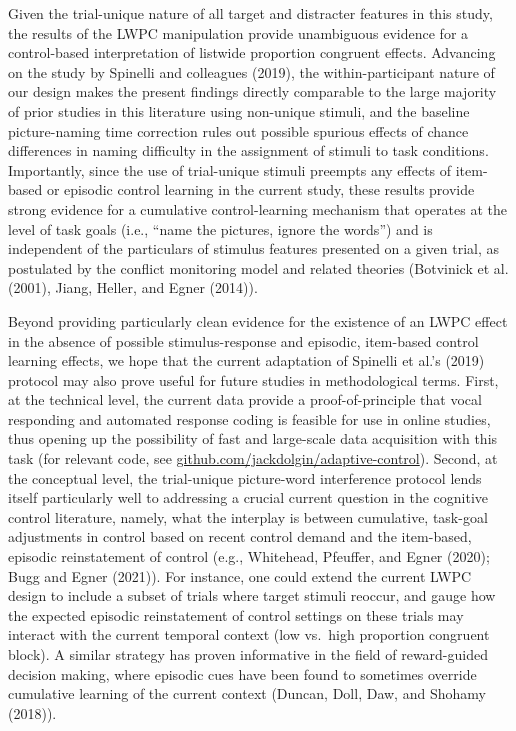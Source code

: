 \documentclass[
  ,man,floatsintext]{apa6}
\begin{document}
Given the trial-unique nature of all target and distracter features in this study, the results of the LWPC manipulation provide unambiguous evidence for a control-based interpretation of listwide proportion congruent effects. Advancing on the study by Spinelli and colleagues (2019), the within-participant nature of our design makes the present findings directly comparable to the large majority of prior studies in this literature using non-unique stimuli, and the baseline picture-naming time correction rules out possible spurious effects of chance differences in naming difficulty in the assignment of stimuli to task conditions. Importantly, since the use of trial-unique stimuli preempts any effects of item-based or episodic control learning in the current study, these results provide strong evidence for a cumulative control-learning mechanism that operates at the level of task goals (i.e., ``name the pictures, ignore the words'') and is independent of the particulars of stimulus features presented on a given trial, as postulated by the conflict monitoring model and related theories (Botvinick et al. (2001), Jiang, Heller, and Egner (2014)).

Beyond providing particularly clean evidence for the existence of an LWPC effect in the absence of possible stimulus-response and episodic, item-based control learning effects, we hope that the current adaptation of Spinelli et al.'s (2019) protocol may also prove useful for future studies in methodological terms. First, at the technical level, the current data provide a proof-of-principle that vocal responding and automated response coding is feasible for use in online studies, thus opening up the possibility of fast and large-scale data acquisition with this task (for relevant code, see \url{github.com/jackdolgin/adaptive-control}). Second, at the conceptual level, the trial-unique picture-word interference protocol lends itself particularly well to addressing a crucial current question in the cognitive control literature, namely, what the interplay is between cumulative, task-goal adjustments in control based on recent control demand and the item-based, episodic reinstatement of control (e.g., Whitehead, Pfeuffer, and Egner (2020); Bugg and Egner (2021)). For instance, one could extend the current LWPC design to include a subset of trials where target stimuli reoccur, and gauge how the expected episodic reinstatement of control settings on these trials may interact with the current temporal context (low vs.~high proportion congruent block). A similar strategy has proven informative in the field of reward-guided decision making, where episodic cues have been found to sometimes override cumulative learning of the current context (Duncan, Doll, Daw, and Shohamy (2018)).
\end{document}
